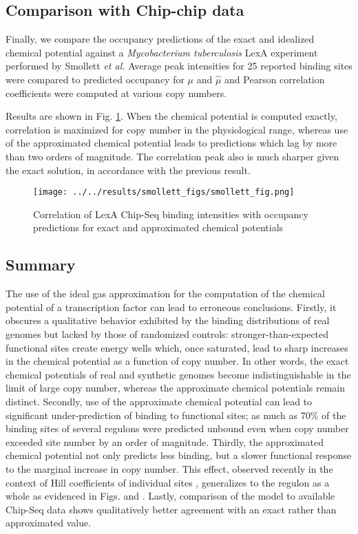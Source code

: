 \documentclass{article}
\begin{document}
\subsection{Comparison with Chip-chip data}
Finally, we compare the occupancy predictions of the exact and
idealized chemical potential against a \textit{Mycobacterium
  tuberculosis} LexA experiment performed by Smollett \textit{et al.}
\cite{smollett12} Average peak intensities for 25 reported binding
sites were compared to predicted occupancy for $\mu$ and $\hat\mu$ and
Pearson correlation coefficients were computed at various copy
numbers.

Results are shown in Fig. \ref{fig:smollett_chip_seq}.  When the
chemical potential is computed exactly, correlation is maximized for
copy number in the physiological range, whereas use of the
approximated chemical potential leads to predictions which lag by more
than two orders of magnitude.  The correlation peak also is much
sharper given the exact solution, in accordance with the previous
result.


\begin{figure}[ht]
  \centering
  \texttt{[image: ../../results/smollett\_figs/smollett\_fig.png]}
  \caption{Correlation of LexA Chip-Seq binding intensities with occupancy predictions for exact and approximated chemical potentials}
  \label{fig:smollett_chip_seq}
\end{figure}

\subsection{Summary}
The use of the ideal gas approximation for the computation of the
chemical potential of a transcription factor can lead to erroneous
conclusions.  Firstly, it obscures a qualitative behavior exhibited by
the binding distributions of real genomes but lacked by those of
randomized controls: stronger-than-expected functional sites create
energy wells which, once saturated, lead to sharp increases in the
chemical potential as a function of copy number.  In other words, the
exact chemical potentials of real and synthetic genomes become
indistinguishable in the limit of large copy number, whereas the
approximate chemical potentials remain distinct.  Secondly, use of the
approximate chemical potential can lead to significant
under-prediction of binding to functional sites; as much as 70\% of
the binding sites of several regulons were predicted unbound even when
copy number exceeded site number by an order of magnitude.  Thirdly,
the approximated chemical potential not only predicts less binding,
but a slower functional response to the marginal increase in copy
number.  This effect, observed recently in the context of Hill
coefficients of individual sites \cite{sheinman12}, generalizes to the
regulon as a whole as evidenced in
Figs. \label{fig:occupancy_vs_copy_number}
and \label{fig:occupancy_vs_copy_number_examples}.  Lastly, comparison
of the model to available Chip-Seq data shows qualitatively better
agreement with an exact rather than approximated value.



 \newpage
{}
 \newpage
\end{document}
